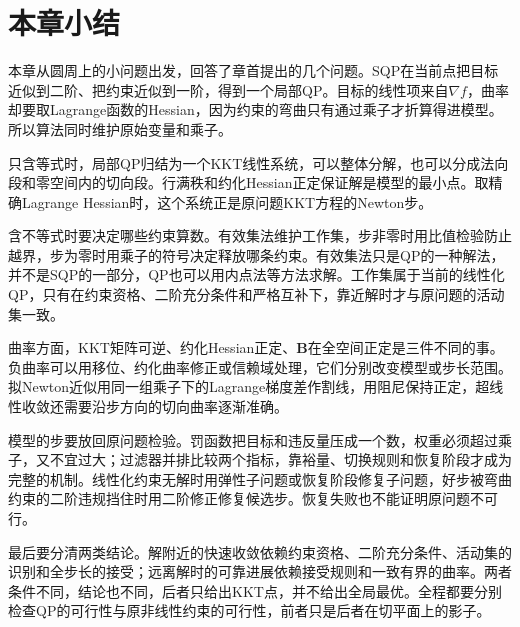 \section{本章小结}
\label{sec:sqp-summary}

本章从圆周上的小问题出发，回答了章首提出的几个问题。SQP在当前点把目标近似到二阶、把约束近似到一阶，得到一个局部QP。目标的线性项来自$\nabla f$，曲率却要取Lagrange函数的Hessian，因为约束的弯曲只有通过乘子才折算得进模型。所以算法同时维护原始变量和乘子。

只含等式时，局部QP归结为一个KKT线性系统，可以整体分解，也可以分成法向段和零空间内的切向段。行满秩和约化Hessian正定保证解是模型的最小点。取精确Lagrange Hessian时，这个系统正是原问题KKT方程的Newton步。

含不等式时要决定哪些约束算数。有效集法维护工作集，步非零时用比值检验防止越界，步为零时用乘子的符号决定释放哪条约束。有效集法只是QP的一种解法，并不是SQP的一部分，QP也可以用内点法等方法求解。工作集属于当前的线性化QP，只有在约束资格、二阶充分条件和严格互补下，靠近解时才与原问题的活动集一致。

曲率方面，KKT矩阵可逆、约化Hessian正定、$\bm{B}$在全空间正定是三件不同的事。负曲率可以用移位、约化曲率修正或信赖域处理，它们分别改变模型或步长范围。拟Newton近似用同一组乘子下的Lagrange梯度差作割线，用阻尼保持正定，超线性收敛还需要沿步方向的切向曲率逐渐准确。

模型的步要放回原问题检验。罚函数把目标和违反量压成一个数，权重必须超过乘子，又不宜过大；过滤器并排比较两个指标，靠裕量、切换规则和恢复阶段才成为完整的机制。线性化约束无解时用弹性子问题或恢复阶段修复子问题，好步被弯曲约束的二阶违规挡住时用二阶修正修复候选步。恢复失败也不能证明原问题不可行。

最后要分清两类结论。解附近的快速收敛依赖约束资格、二阶充分条件、活动集的识别和全步长的接受；远离解时的可靠进展依赖接受规则和一致有界的曲率。两者条件不同，结论也不同，后者只给出KKT点，并不给出全局最优。全程都要分别检查QP的可行性与原非线性约束的可行性，前者只是后者在切平面上的影子。
